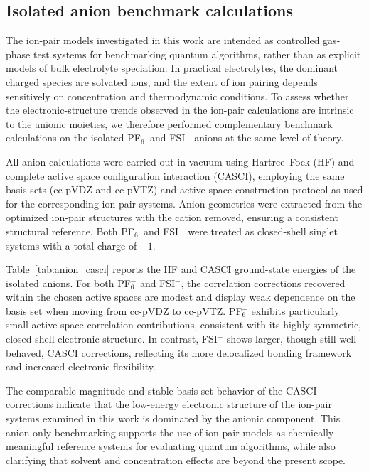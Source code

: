 \documentclass[num-refs]{wiley-article}
\begin{document}
\subsection{Isolated anion benchmark calculations}

The ion-pair models investigated in this work are intended as controlled gas-phase test systems for benchmarking quantum algorithms, rather than as explicit models of bulk electrolyte speciation. In practical electrolytes, the dominant charged species are solvated ions, and the extent of ion pairing depends sensitively on concentration and thermodynamic conditions. To assess whether the electronic-structure trends observed in the ion-pair calculations are intrinsic to the anionic moieties, we therefore performed complementary benchmark calculations on the isolated PF$_6^-$ and FSI$^-$ anions at the same level of theory.

All anion calculations were carried out in vacuum using Hartree--Fock (HF) and complete active space configuration interaction (CASCI), employing the same basis sets (cc-pVDZ and cc-pVTZ) and active-space construction protocol as used for the corresponding ion-pair systems. Anion geometries were extracted from the optimized ion-pair structures with the cation removed, ensuring a consistent structural reference. Both PF$_6^-$ and FSI$^-$ were treated as closed-shell singlet systems with a total charge of $-1$.

Table~\ref{tab:anion_casci} reports the HF and CASCI ground-state energies of the isolated anions. For both PF$_6^-$ and FSI$^-$, the correlation corrections recovered within the chosen active spaces are modest and display weak dependence on the basis set when moving from cc-pVDZ to cc-pVTZ. PF$_6^-$ exhibits particularly small active-space correlation contributions, consistent with its highly symmetric, closed-shell electronic structure. In contrast, FSI$^-$ shows larger, though still well-behaved, CASCI corrections, reflecting its more delocalized bonding framework and increased electronic flexibility.

The comparable magnitude and stable basis-set behavior of the CASCI corrections indicate that the low-energy electronic structure of the ion-pair systems examined in this work is dominated by the anionic component. This anion-only benchmarking supports the use of ion-pair models as chemically meaningful reference systems for evaluating quantum algorithms, while also clarifying that solvent and concentration effects are beyond the present scope.
\end{document}
